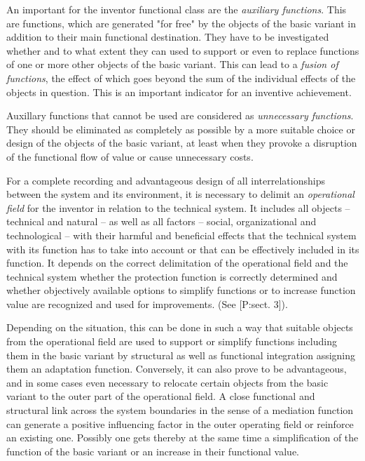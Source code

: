 \documentclass[11pt,a4paper]{article}
\begin{document}
An important for the inventor functional class are the \emph{auxiliary
  functions}. This are functions, which are generated "for free" by the
objects of the basic variant in addition to their main functional
destination. They have to be investigated whether and to what extent they can
used to support or even to replace functions of one or more other objects of
the basic variant. This can lead to a \emph{fusion of functions}, the effect
of which goes beyond the sum of the individual effects of the objects in
question. This is an important indicator for an inventive achievement.

Auxillary functions that cannot be used are considered as \emph{unnecessary
  functions}.  They should be eliminated as completely as possible by a more
suitable choice or design of the objects of the basic variant, at least when
they provoke a disruption of the functional flow of value or cause unnecessary
costs.

For a complete recording and advantageous design of all interrelationships
between the system and its environment, it is necessary to delimit an
\emph{operational field} for the inventor in relation to the technical system.
It includes all objects -- technical and natural -- as well as all factors --
social, organizational and technological -- with their harmful and beneficial
effects that the technical system with its function has to take into account
or that can be effectively included in its function. It depends on the correct
delimitation of the operational field and the technical system whether the
protection function is correctly determined and whether objectively available
options to simplify functions or to increase function value are recognized
and used for improvements. (See [P:sect. 3]).

Depending on the situation, this can be done in such a way that suitable
objects from the operational field are used to support or simplify functions
including them in the basic variant by structural as well as functional
integration assigning them an adaptation function.  Conversely, it can also
prove to be advantageous, and in some cases even necessary to relocate certain
objects from the basic variant to the outer part of the operational field. A
close functional and structural link across the system boundaries in the sense
of a mediation function can generate a positive influencing factor in the
outer operating field or reinforce an existing one. Possibly one gets thereby
at the same time a simplification of the function of the basic variant or an
increase in their functional value.
\end{document}
